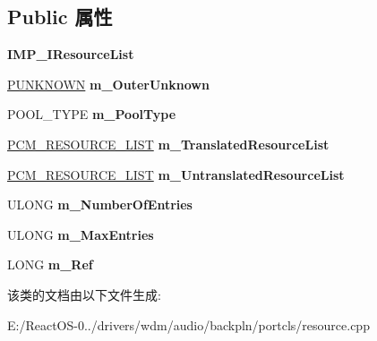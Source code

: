\subsection*{Public 属性}
\begin{DoxyCompactItemize}
\item 
\mbox{\label{class_c_resource_list_af17a3bb007d95395579f182c985fdc8e}} 
{\bfseries I\+M\+P\+\_\+\+I\+Resource\+List}
\item 
\mbox{\label{class_c_resource_list_a5359d5c712059ab2982a7278db06c409}} 
\hyperlink{interface_i_unknown}{P\+U\+N\+K\+N\+O\+WN} {\bfseries m\+\_\+\+Outer\+Unknown}
\item 
\mbox{\label{class_c_resource_list_a146a0e94ca92a8d347d8bd98a19b9248}} 
P\+O\+O\+L\+\_\+\+T\+Y\+PE {\bfseries m\+\_\+\+Pool\+Type}
\item 
\mbox{\label{class_c_resource_list_ac25f69289d806ad6de155570b81f4c1b}} 
\hyperlink{struct___c_m___r_e_s_o_u_r_c_e___l_i_s_t}{P\+C\+M\+\_\+\+R\+E\+S\+O\+U\+R\+C\+E\+\_\+\+L\+I\+ST} {\bfseries m\+\_\+\+Translated\+Resource\+List}
\item 
\mbox{\label{class_c_resource_list_af0f6a3ce9b112f12d2fbe54f117b9cad}} 
\hyperlink{struct___c_m___r_e_s_o_u_r_c_e___l_i_s_t}{P\+C\+M\+\_\+\+R\+E\+S\+O\+U\+R\+C\+E\+\_\+\+L\+I\+ST} {\bfseries m\+\_\+\+Untranslated\+Resource\+List}
\item 
\mbox{\label{class_c_resource_list_acff42f61f2ff2b88a7cfa7b5cbe486a8}} 
U\+L\+O\+NG {\bfseries m\+\_\+\+Number\+Of\+Entries}
\item 
\mbox{\label{class_c_resource_list_aa2dfa7b3d74dda7d6e0323311037cdd6}} 
U\+L\+O\+NG {\bfseries m\+\_\+\+Max\+Entries}
\item 
\mbox{\label{class_c_resource_list_aedfb3fbdd49ecb859d4d021254c8151b}} 
L\+O\+NG {\bfseries m\+\_\+\+Ref}
\end{DoxyCompactItemize}


该类的文档由以下文件生成\+:\begin{DoxyCompactItemize}
\item 
E\+:/\+React\+O\+S-\/0../drivers/wdm/audio/backpln/portcls/resource.\+cpp\end{DoxyCompactItemize}
